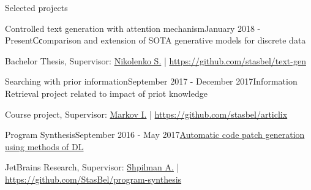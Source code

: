 \documentclass{resume} %
\begin{document}
\begin{rSection}{Selected projects}

\begin{rSubsection}{Controlled text generation with attention mechanism}{January 2018 - Present}{Ссomparison and extension of SOTA generative models for discrete data}{}
\item[] Bachelor Thesis, Supervisor: \href{https://logic.pdmi.ras.ru/~sergey/}{Nikolenko S.} | \url{https://github.com/stasbel/text-gen}
\end{rSubsection}

\begin{rSubsection}{Searching with prior information}{September 2017 - December 2017}{Information Retrieval project related to impact of priot knowledge}{}
\item[] Course project, Supervisor: \href{https://staff.fnwi.uva.nl/i.markov/}{Markov I.} | \url{https://github.com/stasbel/articlix}
\end{rSubsection}

\begin{rSubsection}{Program Synthesis}{September 2016 - May 2017}{\href{https://docs.google.com/presentation/d/113EFcW8L7p8ickhfMoht8ivOomq2fRPizLtWSH9cSX4/pub?start=false&loop=false&delayms=3000}{Automatic code patch generation using methods of DL}}{}
\item[] JetBrains Research, Supervisor: \href{https://research.jetbrains.org/ru/researchers/ashpilman}{Shpilman A.} | \url{https://github.com/StasBel/program-synthesis}
\end{rSubsection}

\end{rSection}
\vspace{-1.2\baselineskip}
\end{document}
